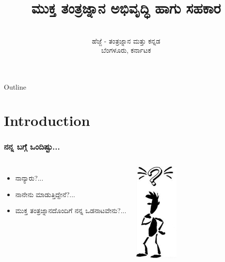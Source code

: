 \documentclass[slidestop,compress,brown]{beamer}
\title[\tiny{\en{Contributing to FLOSS}}]{ಮುಕ್ತ ತಂತ್ರಜ್ನಾನ ಅಭಿವೃದ್ಧಿ ಹಾಗು ಸಹಕಾರ}
\author[ವಾಸು]{\en{Vasudev Kamath}}
\institute[\en{Debian}]{}
\date[ಹೆಜ್ಜೆ, ಬೆಂಗಳೂರು, ಕರ್ನಾಟಕ]{\en{January 22, 2012}\\
  ಹೆಜ್ಜೆ - ತಂತ್ರಜ್ನಾನ ಮತ್ತು ಕನ್ನಡ\\
  ಬೆಂಗಳೂರು, ಕರ್ನಾಟಕ}
\newcommand\en[1]{{\english #1}}
\begin{document}
\begin{frame}
  \titlepage
\end{frame}  

\begin{frame}{\en{Outline}}
  \tableofcontents
\end{frame}

\section{\en{Introduction}}
\begin{frame}
  \frametitle{ನನ್ನ ಬಗ್ಗೆ ಒಂದಿಷ್ಟು...}
  \begin{columns}[c]
    \begin{itemize}[<+->]    
    \item<+-| alert@+> ನಾನ್ಯಾರು?...\\
    \item<+-| alert@+> ನಾನೇನು ಮಾಡುತ್ತಿದ್ದೇನೆ?...\\
    \item<+-| alert@+> ಮುಕ್ತ ತಂತ್ರಜ್ನಾನದೊಂದಿಗೆ ನನ್ನ ಒಡನಾಟವೇನು?...\\
    \end{itemize}
    \includegraphics[height=5cm,keepaspectratio]{who-am-i}
  \end{columns}
\end{frame}

\end{document}
